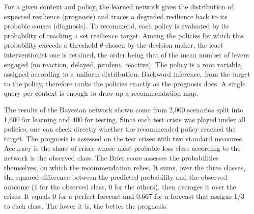 For a given context and policy, the learned network gives the distribution of expected resilience (prognosis) and traces a degraded resilience back to its probable causes (diagnosis). To recommend, each policy is evaluated by its probability of reaching a set resilience target. Among the policies for which this probability exceeds a threshold $\theta$ chosen by the decision maker, the least interventionist one is retained, the order being that of the mean number of levers engaged (no reaction, delayed, prudent, reactive). The policy is a root variable, assigned according to a uniform distribution. Backward inference, from the target to the policy, therefore ranks the policies exactly as the prognosis does. A single query per context is enough to draw up a recommendation map.

The results of the Bayesian network shown come from 2,000 scenarios split into 1,600 for learning and 400 for testing. Since each test crisis was played under all policies, one can check directly whether the recommended policy reached the target. The prognosis is assessed on the test crises with two standard measures. Accuracy is the share of crises whose most probable loss class according to the network is the observed class. The Brier score \citep{brier1950} assesses the probabilities themselves, on which the recommendation relies. It sums, over the three classes, the squared difference between the predicted probability and the observed outcome (1 for the observed class, 0 for the others), then averages it over the crises. It equals 0 for a perfect forecast and 0.667 for a forecast that assigns 1/3 to each class. The lower it is, the better the prognosis.
